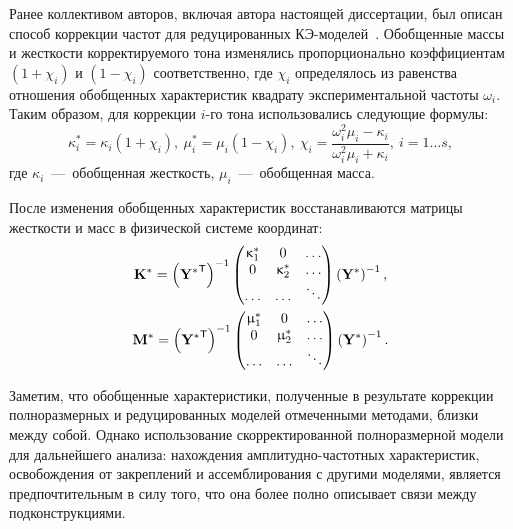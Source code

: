 Ранее коллективом авторов, включая автора настоящей диссертации, был описан способ коррекции частот для редуцированных КЭ-моделей~\cite{lib:author:spacecraft:cms}. Обобщенные массы и жесткости корректируемого тона изменялись пропорционально коэффициентам $ (1 + \chi_i) $ и $ (1 - \chi_i) $ соответственно, где $ \chi_i $ определялось из равенства отношения обобщенных характеристик квадрату экспериментальной частоты $ \omega_i $. Таким образом, для коррекции $ i $-го тона использовались следующие формулы:
\begin{equation}
	\kappa_i ^ * = \kappa_i (1 + \chi_i), \ \mu_i ^ * = \mu_i (1 - \chi_i), \ \chi_i = \frac{\omega_i ^ 2 \mu_i - \kappa_i}{\omega_i ^ 2 \mu_i + \kappa_i}, \ i = 1 \hdots s, \label{eq:reducedGenParametersUpdating}
\end{equation}
где $ \kappa_i $~---~обобщенная жесткость, $ \mu_i $~---~обобщенная масса.

После изменения обобщенных характеристик восстанавливаются матрицы жесткости и масс в физической системе координат:
\begin{equation}
	\begin{gathered}
		\mathbf{K} ^ \ast = 
		\left( \mathbf{Y ^ \ast} ^ \mathsf{T} \right) ^ {-1} 
		\begin{pmatrix}
			\upkappa_1 ^ \ast & 0 & \hdots \\
			0 & \upkappa_2 ^ \ast & \hdots \\
			\hdots & \hdots & \ddots
		\end{pmatrix} 
		\left( \mathbf{Y} ^ \ast \right) ^ {-1}, \\
		\mathbf{M} ^ \ast = 
		\left( \mathbf{Y ^ \ast} ^ \mathsf{T} \right) ^ {-1} 
		\begin{pmatrix}
			\upmu_1 ^ \ast & 0 & \hdots \\
			0 & \upmu_2 ^ \ast & \hdots \\
			\hdots & \hdots & \ddots
		\end{pmatrix}
		\left( \mathbf{Y} ^ \ast \right) ^ {-1}.
	\end{gathered}
	\label{eq:reducedStructuralMatrices}
\end{equation}

Заметим, что обобщенные характеристики, полученные в результате коррекции полноразмерных и редуцированных моделей отмеченными методами, близки между собой. Однако использование скорректированной полноразмерной модели для дальнейшего анализа: нахождения амплитудно-частотных характеристик, освобождения от закреплений и ассемблирования с другими моделями, является предпочтительным в силу того, что она более полно описывает связи между подконструкциями.


